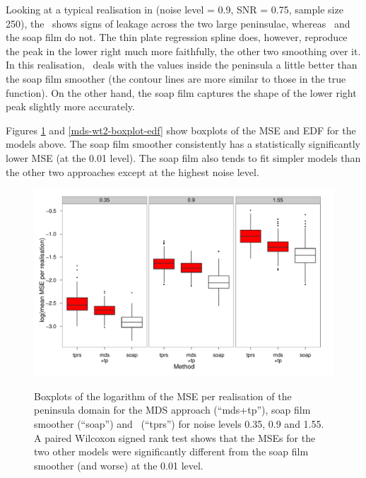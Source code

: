 Looking at a typical realisation in  (noise level = 0.9, SNR = 0.75, sample size 250), the \tprs\ shows signs of leakage across the two large peninsulae, whereas \mdsap\ and the soap film do not. The thin plate regression spline does, however, reproduce the peak in the lower right much more faithfully, the other two smoothing over it. In this realisation, \mdsap\ deals with the values inside the peninsula a little better than the soap film smoother (the contour lines are more similar to those in the true function). On the other hand, the soap film captures the shape of the lower right peak slightly more accurately.

\label{cor-4s6}Figures \ref{mds-wt2-boxplot} and \ref{mds-wt2-boxplot-edf} show boxplots of the MSE and EDF for the models above. The soap film smoother consistently has a statistically significantly lower MSE (at the 0.01 level). The soap film also tends to fit simpler models than the other two approaches except at the highest noise level.

\begin{figure}
\centering
\includegraphics[width=\textwidth]{mds/figs/mds-wt2-boxplot.pdf} \\
\caption{Boxplots of the logarithm of the MSE per realisation of the peninsula domain for the MDS approach (``mds+tp''), soap film smoother (``soap'') and \tprs\ (``tprs'') for noise levels 0.35, 0.9 and 1.55. A paired Wilcoxon signed rank test shows that the MSEs for the two other models were significantly different from the soap film smoother (and worse) at the 0.01 level.}
\label{mds-wt2-boxplot}
\end{figure}

